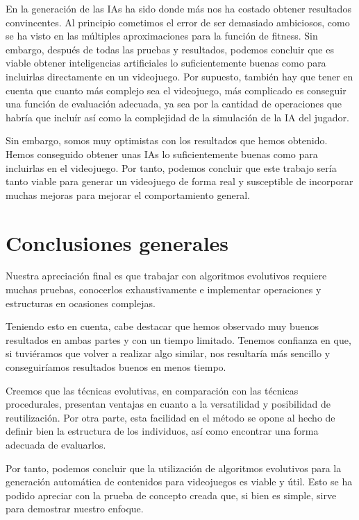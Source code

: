 En la generaci\'on de las IAs ha sido donde m\'as nos ha costado obtener resultados convincentes. Al principio cometimos el error de ser demasiado ambiciosos, como se ha visto en las m\'ultiples aproximaciones para la funci\'on de fitness. Sin embargo, despu\'es de todas las pruebas y resultados, podemos concluir que es viable obtener inteligencias artificiales lo suficientemente buenas como para incluirlas directamente en un videojuego. Por supuesto, tambi\'en hay que tener en cuenta que cuanto m\'as complejo sea el videojuego, m\'as complicado es conseguir una funci\'on de evaluaci\'on adecuada, ya sea por la cantidad de operaciones que habr\'ia que inclu\'ir as\'i como la complejidad de la simulaci\'on de la IA del jugador.\par
Sin embargo, somos muy optimistas con los resultados que hemos obtenido. Hemos conseguido obtener unas IAs lo suficientemente buenas como para incluirlas en el videojuego. Por tanto, podemos concluir que este trabajo ser\'ia tanto viable para generar un videojuego de forma real y susceptible de incorporar muchas mejoras para mejorar el comportamiento general.\par
\section{Conclusiones generales}
Nuestra apreciaci\'on final es que trabajar con algoritmos evolutivos requiere muchas pruebas, conocerlos exhaustivamente e implementar operaciones y estructuras en ocasiones complejas.\par
Teniendo esto en cuenta, cabe destacar que hemos observado muy buenos resultados en ambas partes y con un tiempo limitado. Tenemos confianza en que, si tuvi\'eramos que volver a realizar algo similar, nos resultar\'ia m\'as sencillo y conseguir\'iamos resultados buenos en menos tiempo.\par
Creemos que las t\'ecnicas evolutivas, en comparaci\'on con las t\'ecnicas procedurales, presentan ventajas en cuanto a la versatilidad y posibilidad de reutilizaci\'on. Por otra parte, esta facilidad en el m\'etodo se opone al hecho de definir bien la estructura de los individuos, as\'i como encontrar una forma adecuada de evaluarlos.\par
Por tanto, podemos concluir que la utilizaci\'on de algoritmos evolutivos para la generaci\'on autom\'atica de contenidos para videojuegos es viable y \'util. Esto se ha podido apreciar con la prueba de concepto creada que, si bien es simple, sirve para demostrar nuestro enfoque.\par
